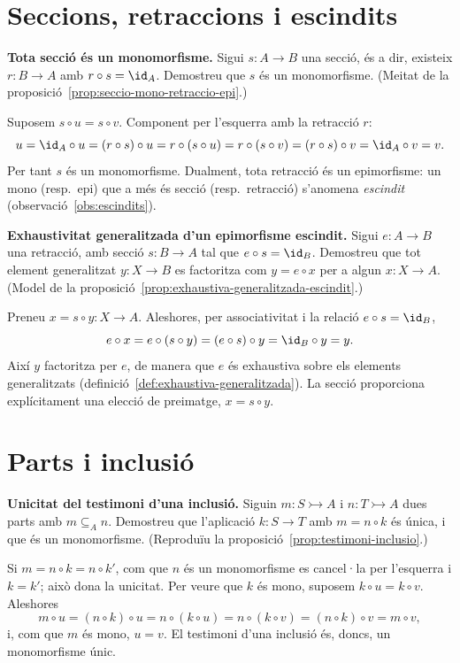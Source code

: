 \section{Seccions, retraccions i escindits}\label{prac:seccio-retraccio}

\begin{exercici}
\textbf{Tota secció és un monomorfisme.} Sigui \(s:A\to B\) una secció, és a dir, existeix \(r:B\to A\) amb \(r\circ s=\id_A\). Demostreu que \(s\) és un monomorfisme. (Meitat de la proposició~\ref{prop:seccio-mono-retraccio-epi}.)
\end{exercici}
\begin{solucio}
Suposem \(s\circ u=s\circ v\). Component per l'esquerra amb la retracció \(r\):
\[
u=\id_A\circ u=(r\circ s)\circ u=r\circ(s\circ u)=r\circ(s\circ v)=(r\circ s)\circ v=\id_A\circ v=v.
\]
Per tant \(s\) és un monomorfisme. Dualment, tota retracció és un epimorfisme: un mono (resp.\ epi) que a més és secció (resp.\ retracció) s'anomena \emph{escindit} (observació~\ref{obs:escindits}).
\end{solucio}

\begin{exercici}
\textbf{Exhaustivitat generalitzada d'un epimorfisme escindit.} Sigui \(e:A\to B\) una retracció, amb secció \(s:B\to A\) tal que \(e\circ s=\id_B\). Demostreu que tot element generalitzat \(y:X\to B\) es factoritza com \(y=e\circ x\) per a algun \(x:X\to A\). (Model de la proposició~\ref{prop:exhaustiva-generalitzada-escindit}.)
\end{exercici}
\begin{solucio}
Preneu \(x=s\circ y:X\to A\). Aleshores, per associativitat i la relació \(e\circ s=\id_B\),
\[
e\circ x=e\circ(s\circ y)=(e\circ s)\circ y=\id_B\circ y=y.
\]
Així \(y\) factoritza per \(e\), de manera que \(e\) és exhaustiva sobre els elements generalitzats (definició~\ref{def:exhaustiva-generalitzada}). La secció proporciona explícitament una elecció de preimatge, \(x=s\circ y\).
\end{solucio}

\section{Parts i inclusió}\label{prac:parts-inclusio}

\begin{exercici}
\textbf{Unicitat del testimoni d'una inclusió.} Siguin \(m:S\rightarrowtail A\) i \(n:T\rightarrowtail A\) dues parts amb \(m\subseteq_A n\). Demostreu que l'aplicació \(k:S\to T\) amb \(m=n\circ k\) és única, i que és un monomorfisme. (Reproduïu la proposició~\ref{prop:testimoni-inclusio}.)
\end{exercici}
\begin{solucio}
Si \(m=n\circ k=n\circ k'\), com que \(n\) és un monomorfisme es cancel·la per l'esquerra i \(k=k'\); això dona la unicitat. Per veure que \(k\) és mono, suposem \(k\circ u=k\circ v\). Aleshores
\[
m\circ u=(n\circ k)\circ u=n\circ(k\circ u)=n\circ(k\circ v)=(n\circ k)\circ v=m\circ v,
\]
i, com que \(m\) és mono, \(u=v\). El testimoni d'una inclusió és, doncs, un monomorfisme únic.
\end{solucio}


